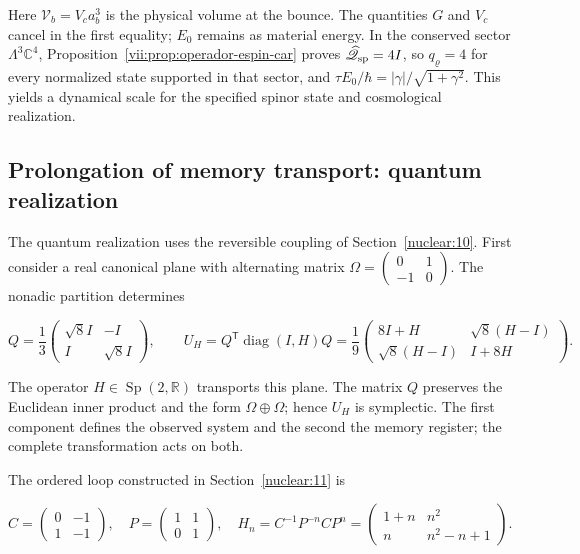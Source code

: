 Here \(\mathcal V_b=V_c a_b^3\) is the physical volume at the bounce. The quantities \(G\) and \(V_c\) cancel in the first equality; \(E_0\) remains as material energy. In the conserved sector \(\Lambda^3\mathbb C^4\), Proposition~\ref{vii:prop:operador-espin-car} proves \(\widehat{\mathscr Q}_{\rm sp}=4I\), so \(q_\varrho=4\) for every normalized state supported in that sector, and \(\tau E_0/\hbar=|\gamma|/\sqrt{1+\gamma^2}\). This yields a dynamical scale for the specified spinor state and cosmological realization.

\subsection{Prolongation of memory transport: quantum realization}

The quantum realization uses the reversible coupling of Section~\ref{nuclear:10}. First consider a real canonical plane with alternating matrix \(\Omega=\left(\begin{smallmatrix}0&1\\-1&0\end{smallmatrix}\right)\). The nonadic partition determines

\begin{equation}
Q=\frac13\begin{pmatrix}\sqrt8 I&-I\\I&\sqrt8 I\end{pmatrix},\qquad
U_H=Q^{\mathsf T}\operatorname{diag}(I,H)Q
=\frac19\begin{pmatrix}8I+H&\sqrt8(H-I)\\
\sqrt8(H-I)&I+8H\end{pmatrix}.
\label{nuc12:eq:5.1}
\end{equation}

The operator \(H\in\operatorname{Sp}(2,\mathbb R)\) transports this plane. The matrix \(Q\) preserves the Euclidean inner product and the form \(\Omega\oplus\Omega\); hence \(U_H\) is symplectic. The first component defines the observed system and the second the memory register; the complete transformation acts on both.

The ordered loop constructed in Section~\ref{nuclear:11} is

\begin{equation}
C=\begin{pmatrix}0&-1\\1&-1\end{pmatrix},\quad
P=\begin{pmatrix}1&1\\0&1\end{pmatrix},\quad
H_n=C^{-1}P^{-n}CP^n
=\begin{pmatrix}1+n&n^2\\n&n^2-n+1\end{pmatrix}.
\label{nuc12:eq:5.2}
\end{equation}

